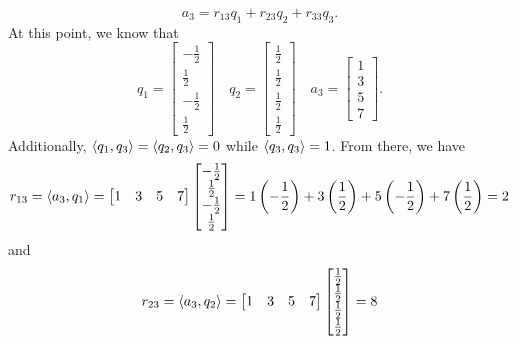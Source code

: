 \documentclass[letterpaper]{article}
\newcommand{\0}{\mathbf{0}}
\begin{document}
\begin{mdframed}
\begin{mdframed}
        \[a_3 = r_{13} q_1 + r_{23}q_2 + r_{33}q_3.\]
        At this point, we know that 
        \[q_1 = \begin{bmatrix}
            -\frac{1}{2} \\ \frac{1}{2} \\ -\frac{1}{2} \\ \frac{1}{2}
        \end{bmatrix} \quad q_2 = \begin{bmatrix}
            \frac{1}{2} \\ \frac{1}{2} \\ \frac{1}{2} \\ \frac{1}{2}
        \end{bmatrix} \quad a_3 = \begin{bmatrix}
            1 \\ 3 \\ 5 \\ 7
        \end{bmatrix}.\]
        Additionally, $\langle q_1, q_3 \rangle = \langle q_2, q_3 \rangle = 0$ while $\langle q_3, q_3 \rangle = 1$. From there, we have
        \[r_{13} = \langle a_3, q_1 \rangle = \begin{bmatrix}
            1 & 3 & 5 & 7
        \end{bmatrix} \begin{bmatrix}
            -\frac{1}{2} \\ \frac{1}{2} \\ -\frac{1}{2} \\ \frac{1}{2}
        \end{bmatrix} = 1\left(-\frac{1}{2}\right) + 3\left(\frac{1}{2}\right) + 5\left(-\frac{1}{2}\right) + 7\left(\frac{1}{2}\right) = 2\]
        and 
        \[r_{23} = \langle a_3, q_2 \rangle = \begin{bmatrix}
            1 & 3 & 5 & 7
        \end{bmatrix} \begin{bmatrix}
            \frac{1}{2} \\ \frac{1}{2} \\ \frac{1}{2} \\ \frac{1}{2}
        \end{bmatrix} = 8\]
    \end{mdframed}


\end{mdframed}
\end{document}
